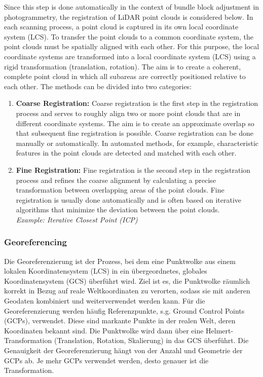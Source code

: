 \begin{English}
    Since this step is done automatically in the context of bundle block adjustment in photogrammetry, the registration of LiDAR point clouds is considered below. In each scanning process, a point cloud is captured in its own local coordinate system (LCS). To transfer the point clouds to a common coordinate system, the point clouds must be spatially aligned with each other. For this purpose, the local coordinate systems are transformed into a local coordinate system (LCS) using a rigid transformation (translation, rotation). The aim is to create a coherent, complete point cloud in which all subareas are correctly positioned relative to each other. The methods can be divided into two categories:

    \begin{enumerate}
        \item \textbf{Coarse Registration:} Coarse registration is the first step in the registration process and serves to roughly align two or more point clouds that are in different coordinate systems. The aim is to create an approximate overlap so that subsequent fine registration is possible. Coarse registration can be done manually or automatically. In automated methods, for example, characteristic features in the point clouds are detected and matched with each other.
        \item \textbf{Fine Registration:} Fine registration is the second step in the registration process and refines the coarse alignment by calculating a precise transformation between overlapping areas of the point clouds. Fine registration is usually done automatically and is often based on iterative algorithms that minimize the deviation between the point clouds. \\
        \textit{Example: Iterative Closest Point (ICP)}
    \end{enumerate}
\end{English}

\subsubsection{Georeferencing}
\begin{German}
    Die Georeferenzierung ist der Prozess, bei dem eine Punktwolke aus einem lokalen Koordinatensystem (LCS) in ein übergeordnetes, globales Koordinatensystem (GCS) überführt wird. Ziel ist es, die Punktwolke räumlich korrekt in Bezug auf reale Weltkoordinaten zu verorten, sodass sie mit anderen Geodaten kombiniert und weiterverwendet werden kann. Für die Georeferenzierung werden häufig Referenzpunkte, s.g. Ground Control Points (GCPs), verwendet. Diese sind markante Punkte in der realen Welt, deren Koordinaten bekannt sind. Die Punktwolke wird dann über eine Helmert-Transformation (Translation, Rotation, Skalierung) in das GCS überführt. Die Genauigkeit der Georeferenzierung hängt von der Anzahl und Geometrie der GCPs ab. Je mehr GCPs verwendet werden, desto genauer ist die Transformation. \cite{voordendagKursGeodaetischeMesstechnik}
\end{German}

